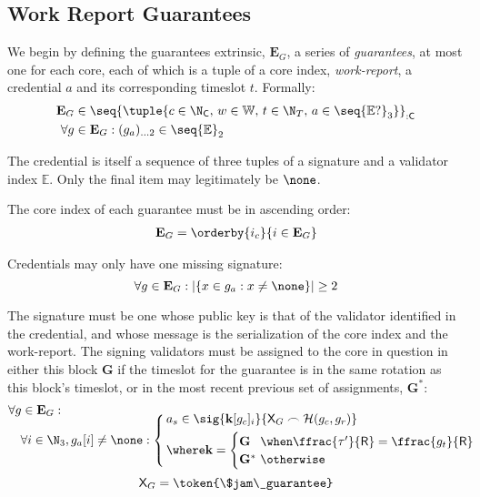 \subsection{Work Report Guarantees}\label{sec:workreportguarantees}

We begin by defining the guarantees extrinsic, $\mathbf{E}_G$, a series of \emph{guarantees}, at most one for each core, each of which is a tuple of a core index, \emph{work-report}, a credential $a$ and its corresponding timeslot $t$. Formally:
\begin{align}
  \mathbf{E}_G &\in \seq{\tuple{
    c \in \N_\mathsf{C},\, w \in \mathbb{W},\, t \in \N_T,\, a \in \seq{\mathbb{E}?}_3
  }}_{:\mathsf{C}} \\
  \forall g &\in \mathbf{E}_G : (g_a)_{\dots2} \in \seq{\mathbb{E}}_2
\end{align}

The credential is itself a sequence of three tuples of a signature and a validator index $\mathbb{E}$. Only the final item may legitimately be $\none$.

The core index of each guarantee must be in ascending order:
\begin{align}
  \mathbf{E}_G = \orderby{i_c}{i \in \mathbf{E}_G}
\end{align}

Credentials may only have one missing signature:
\begin{equation}
  \forall g \in \mathbf{E}_G : |\{x \in g_a : x \ne \none\}| \ge 2
\end{equation}

The signature must be one whose public key is that of the validator identified in the credential, and whose message is the serialization of the core index and the work-report. The signing validators must be assigned to the core in question in either this block $\mathbf{G}$ if the timeslot for the guarantee is in the same rotation as this block's timeslot, or in the most recent previous set of assignments, $\mathbf{G}^*$:
\begin{align}\label{eq:guarantorsig}
    \nonumber&\forall g \in \mathbf{E}_G:\\[-9pt]
    &\quad\forall i \in \N_3, g_a[i] \ne \none: \left\{\,\begin{aligned}
      &a_s \in \sig{\mathbf{k}[g_c]_i}{\mathsf{X}_G\frown\mathcal{H}(g_c, g_r)}\\
      &\where \mathbf{k} = \begin{cases}
        \mathbf{G} \!\!\!\!&\when \ffrac{\tau'}{\mathsf{R}} = \ffrac{g_t}{\mathsf{R}} \\
        \mathbf{G}^* \!\!\!\!&\otherwise
      \end{cases}
    \end{aligned}\right.\!\!\!\!\!\!
\end{align}
\begin{equation}
  \mathsf{X}_G = \token{\$jam\_guarantee}
\end{equation}

